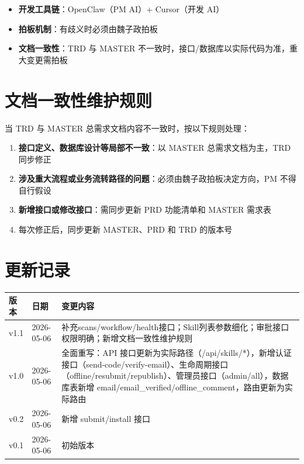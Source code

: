 \documentclass[11pt,a4paper]{article}
\begin{document}
\begin{itemize}[nosep]
  \item \textbf{开发工具链}：OpenClaw（PM AI）+ Cursor（开发 AI）
  \item \textbf{拍板机制}：有歧义时必须由魏子政拍板
  \item \textbf{文档一致性}：TRD 与 MASTER 不一致时，接口/数据库以实际代码为准，重大变更需拍板
\end{itemize}

\section{文档一致性维护规则}

当 TRD 与 MASTER 总需求文档内容不一致时，按以下规则处理：
\begin{enumerate}[nosep]
  \item \textbf{接口定义、数据库设计等局部不一致}：以 MASTER 总需求文档为主，TRD 同步修正
  \item \textbf{涉及重大流程或业务流转路径的问题}：必须由魏子政拍板决定方向，PM 不得自行假设
  \item \textbf{新增接口或修改接口}：需同步更新 PRD 功能清单和 MASTER 需求表
  \item 每次修正后，同步更新 MASTER、PRD 和 TRD 的版本号
\end{enumerate}

\section*{更新记录}

\begin{tabular}{lll}
\toprule
版本 & 日期 & 变更内容 \\
\midrule
v1.1 & 2026-05-06 & 补充scans/workflow/health接口；Skill列表参数细化；审批接口权限明确；新增文档一致性维护规则 \\
v1.0 & 2026-05-06 & 全面重写：API 接口更新为实际路径（/api/skills/*），新增认证接口（send-code/verify-email）、生命周期接口（offline/resubmit/republish）、管理员接口（admin/all），数据库表新增 email/email\_verified/offline\_comment，路由更新为实际路由 \\
v0.2 & 2026-05-06 & 新增 submit/install 接口 \\
v0.1 & 2026-05-06 & 初始版本 \\
\bottomrule
\end{tabular}
\end{document}
